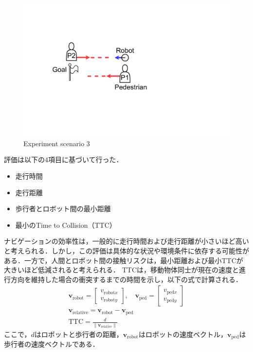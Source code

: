 \begin{figure}[H]
  \centering
  \includegraphics[keepaspectratio, scale=0.15]{images/scenario3.pdf}
  \caption{Experiment scenario 3}
  \label{Fig:scenario3}
\end{figure}


評価は以下の4項目に基づいて行った．
\begin{itemize}
  \item 走行時間
  \item 走行距離
  \item 歩行者とロボット間の最小距離
  \item 最小のTime to Collision（TTC）
\end{itemize}

ナビゲーションの効率性は，一般的に走行時間および走行距離が小さいほど高いと考えられる．しかし，この評価は具体的な状況や環境条件に依存する可能性がある．一方で，人間とロボット間の接触リスクは，最小距離および最小TTCが大きいほど低減されると考えられる．
TTCは，移動物体同士が現在の速度と進行方向を維持した場合の衝突するまでの時間を示し，以下の式で計算される．
\setlength{\jot}{1em}
\begin{align}
  \mathbf{v}_{\text{robot}} = \begin{bmatrix} v_{\text{robot}x} \\ v_{\text{robot}y} \end{bmatrix}, \quad 
  \mathbf{v}_{\text{ped}} = \begin{bmatrix} v_{\text{ped}x} \\ v_{\text{ped}y} \end{bmatrix} \\
  \mathbf{v}_{\text{relative}} = \mathbf{v}_{\text{robot}} - \mathbf{v}_{\text{ped}} \\
  \text{TTC} = \frac{d}{\|\mathbf{v}_{\text{relative}}\|}
\end{align}
ここで，$d$はロボットと歩行者の距離，$\mathbf{v}_{\text{robot}}$はロボットの速度ベクトル，$\mathbf{v}_{\text{ped}}$は歩行者の速度ベクトルである．

